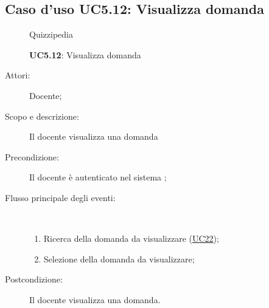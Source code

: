 \subsection{Caso d'uso UC5.12: Visualizza domanda}
	\begin{figure}[H]
		\centering
		\begin{resizedtikzpicture}{\textwidth}
		\begin{umlsystem}[x=0, fill=lightgray!20]{Quizzipedia}
		\end{umlsystem}
		\end{resizedtikzpicture}
		\caption{\textbf{UC5.12}: Visualizza domanda}
		\label{UC5.12}
	\end{figure}
\begin{description}
\item[Attori:] Docente;
\item[Scopo e descrizione:] Il docente visualizza una domanda
      \item[Precondizione:] Il docente è autenticato nel sistema
;

        \item[Flusso principale degli eventi:] \ 
 \begin{enumerate}
          \item Ricerca della domanda da visualizzare (\hyperlink{UC22}{UC22});
          \item Selezione della domanda da visualizzare;

      \end{enumerate}
    \item[Postcondizione:] Il docente visualizza una domanda.
  \end{description}
\hypertarget{UC5.13}{}
